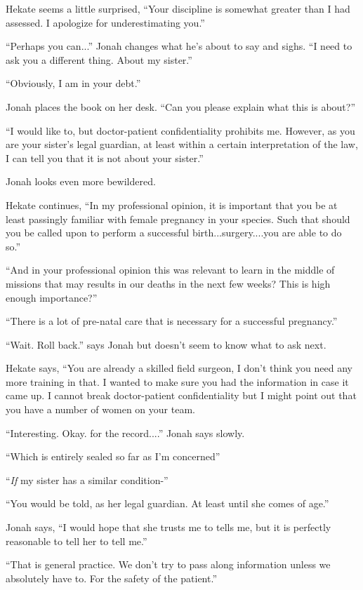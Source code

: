 Hekate seems a little surprised, ``Your discipline is somewhat greater than I had assessed.  I apologize for underestimating you.''

``Perhaps you can...'' Jonah changes what he's about to say and sighs.  ``I need to ask you a different thing.  About my sister.''

``Obviously, I am in your debt.''



Jonah places the book on her desk. ``Can you please explain what this is about?''

``I would like to, but doctor-patient confidentiality prohibits me.  However, as you are your sister's legal guardian, at least within a certain interpretation of the law, I can tell you that it is not about your sister.''

Jonah looks even more bewildered.

Hekate continues, ``In my professional opinion, it is important that you be at least passingly familiar with female pregnancy in your species.  Such that should you be called upon to perform a successful birth...surgery....you are able to do so.''

``And in your professional opinion this was relevant to learn in the middle of missions that may results in our deaths in the next few weeks?  This is high enough importance?''

``There is a lot of pre-natal care that is necessary for a successful pregnancy.''

``Wait.  Roll back.'' says Jonah but doesn't seem to know what to ask next.

Hekate says, ``You are already a skilled field surgeon, I don't think you need any more training in that.  I wanted to make sure you had the information in case it came up.  I cannot break doctor-patient confidentiality but I might point out that you have a number of women on your team.

``Interesting.  Okay.  for the record....'' Jonah says slowly.

``Which is entirely sealed so far as I'm concerned''

``\textit{If} my sister has a similar condition-''

``You would be told, as her legal guardian.  At least until she comes of age.''

Jonah says, ``I would hope that she trusts me to tells me, but it is perfectly reasonable to tell her to tell me.''

``That is general practice.  We don't try to pass along information unless we absolutely have to.  For the safety of the patient.''


